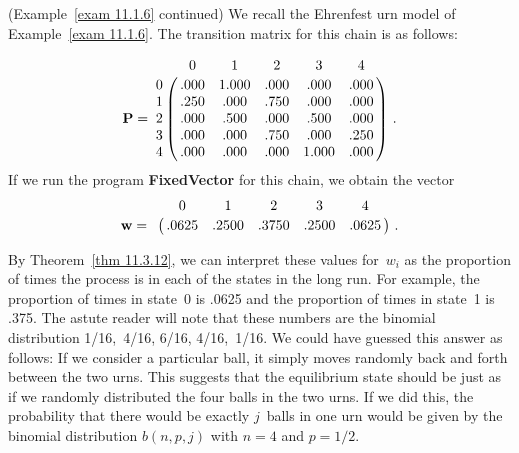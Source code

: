 \begin{example}\label{exam 11.3.4}(Example~\ref{exam 11.1.6} continued)
We recall the Ehrenfest urn model of Example~\ref{exam 11.1.6}.
The transition
matrix for this chain is as follows:

$$
\mat {P} = \bordermatrix{
  & 0    & 1     &  2   & 3    & 4   \cr
0 & .000 & 1.000 & .000 & .000 & .000\cr
1 & .250 &  .000 & .750 & .000 & .000\cr
2 & .000 &  .500 & .000 & .500 & .000\cr
3 & .000 &  .000 & .750 & .000 & .250\cr
4 & .000 &  .000 & .000 &1.000 & .000}\ .
$$
If we run the program {\bf FixedVector} for this chain, we obtain the vector
$$
\mat {w} = \bordermatrix{ 
  &     0  &    1  &    2  &    3  &    4\cr
  & .0625  &.2500  &.3750  &.2500  &.0625}\ .
$$

By Theorem~\ref{thm 11.3.12}, we can interpret these values for~$w_i$ as the
proportion of times the process is in each of the states in the long run.  For
example, the proportion of times in state~0 is .0625 and the proportion of
times in state~1 is .375.  The astute reader will note that these numbers are
the binomial distribution 1/16,~4/16, 6/16, 4/16,~1/16.  We could have guessed
this answer as follows: If we consider a particular ball, it simply moves
randomly back and forth between the two urns.  This suggests that the
equilibrium state should be just as if we randomly distributed the four balls
in the two urns.  If we did this, the probability that there would be exactly
$j$~balls in one urn would be given by the binomial distribution $b(n,p,j)$
with $n = 4$ and $p = 1/2$.
\end{example}

